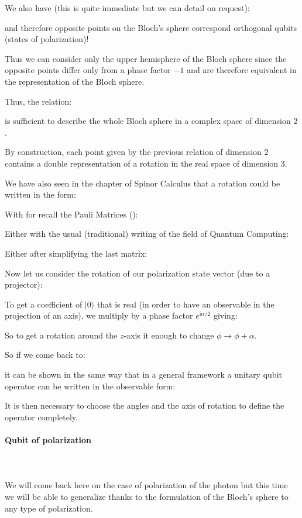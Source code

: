 	We also have (this is quite immediate but we can detail on request):
	
	and therefore opposite points on the Bloch's sphere correspond orthogonal qubits (states of polarization)!

	Thus we can consider only the upper hemisphere of the Bloch sphere since the opposite points differ only from a phase factor $-1$ and are therefore equivalent in the representation of the Bloch sphere.

	Thus, the relation:
	
	is sufficient to describe the whole Bloch sphere in a complex space of dimension $2$.

	By construction, each point given by the previous relation of dimension $2$ contains a double representation of a rotation in the real space of dimension $3$.

	We have also seen in the chapter of Spinor Calculus that a rotation could be written in the form:
	
	With for recall the Pauli Matrices ():
	
	Either with the usual (traditional) writing of the field of Quantum Computing:
	
	Either after simplifying the last matrix:
	
	Now let us consider the rotation of our polarization state vector (due to a projector):
	
	To get a coefficient of $|0\rangle$ that is real (in order to have an observable in the projection of an axis), we multiply by a phase factor $e^{\mathrm{i}\alpha/2}$ giving:
	
	So to get a rotation around the $z$-axis it enough to change $\phi\rightarrow \phi+\alpha$.

	So if we come back to:
	
	it can be shown in the same way that in a general framework a unitary qubit operator can be written in the observable form:
	
	It is then necessary to choose the angles and the axis of rotation to define the operator completely.
	
	\paragraph{Qubit of polarization}\mbox{}\\\\
	We will come back here on the case of polarization of the photon but this time we will be able to generalize thanks to the formulation of the Bloch's sphere to any type of polarization.

